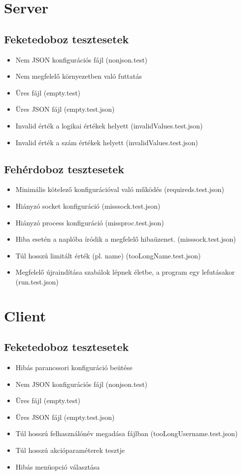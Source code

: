 \documentclass[12pt]{report}
\begin{document}
\section{Server}
\subsection{Feketedoboz tesztesetek}
\begin{itemize}
\item Nem JSON konfigurációs fájl (nonjson.test)
\item Nem megfelelő környezetben való futtatás
\item Üres fájl (empty.test)
\item Üres JSON fájl (empty.test.json)
\item Invalid érték a logikai értékek helyett (invalidValues.test.json)
\item Invalid érték a szám értékek helyett (invalidValues.test.json)
\end{itemize}
\subsection{Fehérdoboz tesztesetek}
\begin{itemize}
\item Minimális kötelező konfigurációval való működés (requireds.test.json)
\item Hiányzó socket konfiguráció (misssock.test.json)
\item Hiányzó process konfiguráció (missproc.test.json)
\item Hiba esetén a naplóba íródik a megfelelő hibaüzenet. (misssock.test.json)
\item Túl hosszú limitált érték (pl. name) (tooLongName.test.json)
\item Megfelelő újraindítása szabálok lépnek életbe, a program egy lefutásakor (run.test.json)
\end{itemize}
\section{Client}
\subsection{Feketedoboz tesztesetek}
\begin{itemize}
\item Hibás parancssori konfiguráció beütése
\item Nem JSON konfigurációs fájl (nonjson.test)
\item Üres fájl (empty.test)
\item Üres JSON fájl (empty.test.json)
\item Túl hosszú felhasználónév megadása fájlban (tooLongUsername.test.json)
\item Túl hosszú akcióparaméterek tesztje
\item Hibás menüopció választása
\end{itemize}
\end{document}
